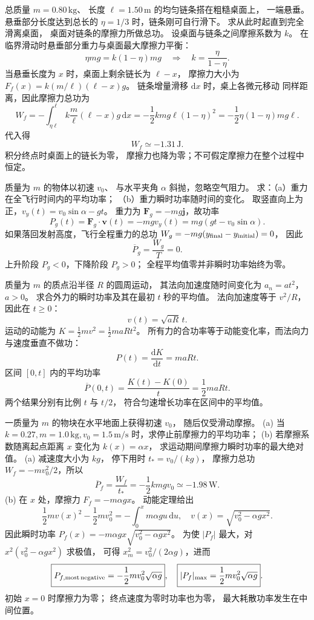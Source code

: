 总质量 $m=0.80\,\mathrm{kg}$、
长度 $\ell=1.50\,\mathrm m$ 的均匀链条搭在粗糙桌面上，
一端悬垂。悬垂部分长度达到总长的
$\eta=1/3$ 时，链条刚可自行滑下。
求从此时起直到完全滑离桌面，
桌面对链条的摩擦力所做总功。
\exsolution
设桌面与链条之间摩擦系数为 $k$。
在临界滑动时悬垂部分重力与桌面最大摩擦力平衡：
\[
\eta mg=k(1-\eta)mg
\quad\Longrightarrow\quad
k=\frac{\eta}{1-\eta}.
\]
当悬垂长度为 $x$ 时，桌面上剩余链长为 $\ell-x$，
摩擦力大小为
$F_f(x)=k(m/\ell)(\ell-x)g$。
链条增量滑移 $\mathrm dx$ 时，桌上各微元移动
同样距离，因此摩擦力总功为
\[
W_f=-\int_{\eta\ell}^{\ell}
 k\frac m\ell(\ell-x)g\,\mathrm dx
=-\frac12kmg\ell(1-\eta)^2
=-\frac12\eta(1-\eta)mg\ell .
\]
代入得
\[
\boxed{W_f\simeq-1.31\,\mathrm J}.
\]
\excheck 积分终点时桌面上的链长为零，
摩擦力也降为零；不可假定摩擦力在整个过程中恒定。

质量为 $m$ 的物体以初速 $v_0$、
与水平夹角 $\alpha$ 斜抛，忽略空气阻力。
求：（a）重力在全飞行时间内的平均功率；
（b）重力瞬时功率随时间的变化。
\exsolution
取竖直向上为正，$v_y(t)=v_0\sin\alpha-gt$。
重力为 $\bm F_g=-mg\bm j$，故功率
\[
\boxed{P_g(t)=\bm F_g\cdot\bm v(t)
=-mgv_y(t)=mg(gt-v_0\sin\alpha)}.
\]
如果落回发射高度，飞行全程重力的总功
$W_g=-mg(y_{\rm final}-y_{\rm initial})=0$，
因此
\[
\boxed{\overline{P}_g=\frac{W_g}{T}=0}.
\]
\excheck 上升阶段 $P_g<0$，下降阶段 $P_g>0$；
全程平均值零并非瞬时功率始终为零。

质量为 $m$ 的质点沿半径 $R$ 的圆周运动，
其法向加速度随时间变化为 $a_n=at^2$，$a>0$。
求合外力的瞬时功率及其在最初 $t$ 秒的平均值。
\exsolution
法向加速度等于 $v^2/R$，因此在 $t\ge0$：
\[
v(t)=\sqrt{aR}\,t.
\]
运动的动能为
$K=\frac12mv^2=\frac12maRt^2$。
所有力的合功率等于动能变化率，而法向力与速度垂直不做功：
\[
\boxed{P(t)=\frac{\mathrm dK}{\mathrm dt}=maRt}.
\]
区间 $[0,t]$ 内的平均功率
\[
\boxed{\overline P(0,t)=\frac{K(t)-K(0)}t
=\frac12maRt}.
\]
\excheck 两个结果分别有比例 $t$ 与 $t/2$，
符合匀速增长功率在区间中的平均值。

一质量为 $m$ 的物块在水平地面上获得初速 $v_0$，
随后仅受滑动摩擦。
(a) 当 $k=0.27,m=1.0\,\mathrm{kg},v_0=1.5\,\mathrm{m/s}$
时，求停止前摩擦力的平均功率；
(b) 若摩擦系数随离起点距离 $x$ 变化为 $k(x)=\alpha x$，
求运动期间摩擦力瞬时功率的最大绝对值。
\exsolution
(a) 减速度大小为 $kg$，
停下用时 $t_*=v_0/(kg)$，
摩擦力总功 $W_f=-mv_0^2/2$，所以
\[
\boxed{\overline P_f=
\frac{W_f}{t_*}=-\frac12kmgv_0
\simeq-1.98\,\mathrm W}.
\]
(b) 在 $x$ 处，摩擦力 $F_f=-m\alpha gx$。
动能定理给出
\[
\frac12mv(x)^2-\frac12mv_0^2
=-\int_0^x m\alpha gu\,\mathrm du,
\quad
v(x)=\sqrt{v_0^2-\alpha gx^2}.
\]
因此瞬时功率
$P_f(x)=-m\alpha gx\sqrt{v_0^2-\alpha gx^2}$。
为使 $|P_f|$ 最大，对
$x^2(v_0^2-\alpha gx^2)$ 求极值，
可得 $x_m^2=v_0^2/(2\alpha g)$，进而
\[
\boxed{P_{f,\rm most\,negative}
=-\frac12m v_0^2\sqrt{\alpha g}},
\quad
\boxed{|P_f|_{\max}=\frac12m v_0^2\sqrt{\alpha g}}.
\]
\excheck 初始 $x=0$ 时摩擦力为零；
终点速度为零时功率也为零，
最大耗散功率发生在中间位置。

